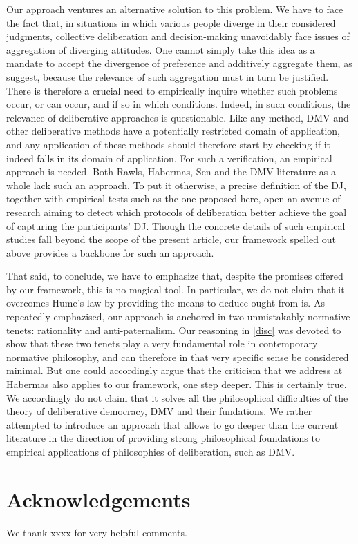 \documentclass[version=3.21, pagesize, twoside=off, bibliography=totoc, DIV=calc, fontsize=12pt, a4paper, french, english]{scrartcl}
\newenvironment{acknowledgements}{
	\section*{Acknowledgements}
}{
}
\begin{document}
Our approach ventures an alternative solution to this problem. 
We have to face the fact that, in situations in which various people diverge in their considered judgments, collective deliberation and decision-making unavoidably face issues of aggregation of diverging attitudes. 
One cannot simply take this idea as a mandate to accept the divergence of preference and additively aggregate them, as \citeauthor{bartkowski_beyond_2018} suggest, because the relevance of such aggregation must in turn be justified. 
There is therefore a crucial need to empirically inquire whether such problems occur, or can occur, and if so in which conditions. Indeed, in such conditions, the relevance of deliberative approaches is questionable. 
Like any method, DMV and other deliberative methods have a potentially restricted domain of application, and any application of these methods should therefore start by checking if it indeed falls in its domain of application. 
For such a verification, an empirical approach is needed. 
Both Rawls, Habermas, Sen and the DMV literature as a whole lack such an approach. 
To put it otherwise, a precise definition of the \ac{DJ}, together with empirical tests such as the one proposed here, open an avenue of research aiming to detect which protocols of deliberation better achieve the goal of capturing the participants’ \ac{DJ}.
Though the concrete details of such empirical studies fall beyond the scope of the present article, our framework spelled out above provides a backbone for such an approach.

That said, to conclude, we have to emphasize that, despite the promises offered by our framework, this is no magical tool. 
In particular, we do not claim that it overcomes Hume's law by providing the means to deduce ought from is. 
As repeatedly emphazised, our approach is anchored in two unmistakably normative tenets: rationality and anti-paternalism. 
Our reasoning in \cref{disc} was devoted to show that these two tenets play a very fundamental role in contemporary normative philosophy, and can therefore in that very specific sense be considered minimal. 
But one could accordingly argue that the criticism that we address at Habermas also applies to our framework, one step deeper. This is certainly true. 
We accordingly do not claim that it solves all the philosophical difficulties of the theory of deliberative democracy, DMV and their fundations. 
We rather attempted to introduce an approach that allows to go deeper than the current literature in the direction of providing strong philosophical foundations to empirical applications of philosophies of deliberation, such as DMV. 


\begin{acknowledgements}
We thank xxxx for very helpful comments.
\end{acknowledgements}



\end{document}
